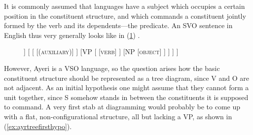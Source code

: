 












It is commonly assumed that languages have a subject which occupies a certain
position in the constituent structure, and which commands a constituent jointly
formed by the verb and its dependents---the predicate. An SVO sentence in
English thus very generally looks like in (\ref{ex:basicsvo})
\parencite[compare the examples in][101--111]{bresnan2016}.

\begin{figure}
\ex\label{ex:basicsvo}
\begin{forest}
[IP
	[NP
		[\textsc{subject}]
	]
	[
		[
			[\textsc{(auxiliary)}]
		]
		[VP
				[
					[\textsc{verb}]
				]
				[NP
					[\textsc{object}]
				]
		]
	]
]
\end{forest}
\xe
\end{figure}

However, Ayeri is a VSO language, so the question arises how the basic
constituent structure should be represented as a tree diagram, since V and O
are not adjacent. As an initial hypothesis one might assume that they cannot
form a unit together, since S somehow stands in between the constituents it is
supposed to command. A very first stab at diagramming would probably be to come
up with a flat, non-configurational structure, all but lacking a VP, as shown
in (\ref{ex:ayrtreefirsthypo}).

